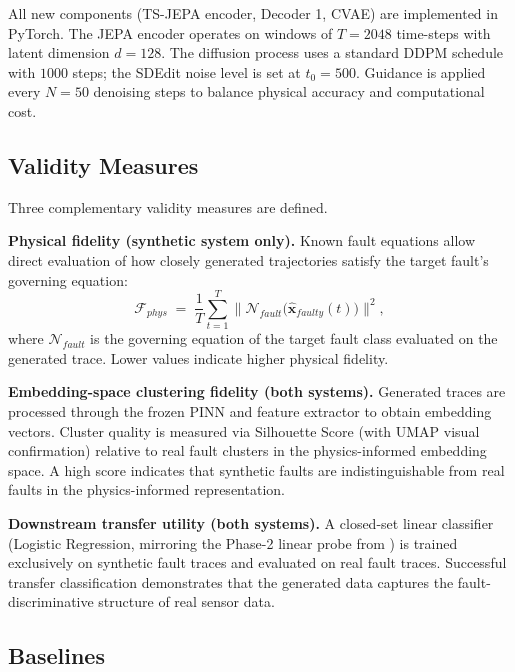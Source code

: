\documentclass[conference]{IEEEtran}
\newcommand{\x}{\mathbf{x}}
\begin{document}
All new components (TS-JEPA encoder, Decoder 1, CVAE) are implemented in PyTorch. The JEPA encoder operates on windows of $T=2048$ time-steps with latent dimension $d=128$. The diffusion process uses a standard DDPM schedule with $1000$ steps; the SDEdit noise level is set at $t_0=500$. Guidance is applied every $N=50$ denoising steps to balance physical accuracy and computational cost.

\subsection{Validity Measures}

Three complementary validity measures are defined.

\textbf{Physical fidelity (synthetic system only).} Known fault equations allow direct evaluation of how closely generated trajectories satisfy the target fault's governing equation:
\begin{equation}
  \mathcal{F}_{phys} \;=\;
    \frac{1}{T}\sum_{t=1}^{T}
    \bigl\|\mathcal{N}_{fault}\!\bigl(\hat{\x}_{faulty}(t)\bigr)\bigr\|^2,
  \label{eq:fidelity}
\end{equation}
where $\mathcal{N}_{fault}$ is the governing equation of the target fault class evaluated on the generated trace. Lower values indicate higher physical fidelity.

\textbf{Embedding-space clustering fidelity (both systems).} Generated traces are processed through the frozen PINN and feature extractor to obtain embedding vectors. Cluster quality is measured via Silhouette Score (with UMAP visual confirmation) relative to real fault clusters in the physics-informed embedding space. A high score indicates that synthetic faults are indistinguishable from real faults in the physics-informed representation.

\textbf{Downstream transfer utility (both systems).} A closed-set linear classifier (Logistic Regression, mirroring the Phase-2 linear probe from \cite{spotorno2026linking}) is trained exclusively on synthetic fault traces and evaluated on real fault traces. Successful transfer classification demonstrates that the generated data captures the fault-discriminative structure of real sensor data.

\subsection{Baselines}
\end{document}
